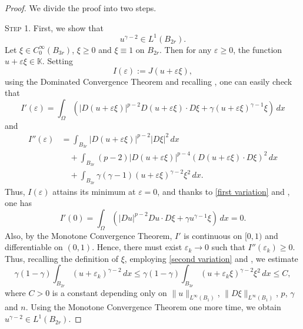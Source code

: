 \documentclass[11pt, reqno]{amsart}
\numberwithin{equation}{section}
\numberwithin{theorem}{section}
\numberwithin{lemma}{section}
\numberwithin{corollary}{section}
\numberwithin{remark}{section}
\numberwithin{proposition}{section}
\numberwithin{definition}{section}
\begin{document}
\begin{proof} We divide the proof into two steps.

    \textsc{Step 1.} First, we show that
    \begin{equation}\label{new integrability}
        u^{\gamma-2}\in L^1(B_{2r}).
    \end{equation}
    Let $\xi\in C_0^\infty(B_{3r})$, $\xi\ge0$ and $\xi\equiv1$ on $B_{2r}$. Then for any $\varepsilon\ge0$, the function $u+\varepsilon\xi\in\mathbb{K}$. Setting 
    $$
    I(\varepsilon):=J(u+\varepsilon\xi),
    $$
    using the Dominated Convergence Theorem and recalling , one can easily check that 
    \begin{equation}\label{first variation}
        I'(\varepsilon)=\int_\Omega(|D(u+\varepsilon\xi)|^{p-2}D(u+\varepsilon\xi)\cdot D\xi+\gamma(u+\varepsilon\xi)^{\gamma-1}\xi)\,dx
    \end{equation}
    and
    \begin{align}\label{second variation}
        I''(\varepsilon)&=\int_{B_{3r}}|D(u+\varepsilon\xi)|^{p-2}|D\xi|^2\,dx\nonumber\\
        &\quad+\int_{B_{3r}}(p-2)|D(u+\varepsilon\xi)|^{p-4}(D(u+\varepsilon\xi)\cdot D\xi)^2\,dx\nonumber\\
        &\quad+\int_{B_{3r}}\gamma(\gamma-1)(u+\varepsilon\xi)^{\gamma-2}\xi^2\,dx.
    \end{align}
    Thus, $I(\varepsilon)$ attains its minimum at $\varepsilon=0$, and thanks to \eqref{first variation} and , one has
    $$
    I'(0)=\int_\Omega(|Du|^{p-2}Du\cdot D\xi+\gamma u^{\gamma-1}\xi)\,dx=0.
    $$
    Also, by the Monotone Convergence Theorem, $I'$ is continuous on $[0,1)$ and differentiable on $(0,1)$. Hence, there must exist $\varepsilon_k\to0$ such that $I''(\varepsilon_k)\ge0$. Thus, recalling the definition of $\xi$, employing \eqref{second variation} and , we estimate
    \begin{equation*}
        \gamma(1-\gamma)\int_{B_{2r}}(u+\varepsilon_k)^{\gamma-2}\,dx\le\gamma(1-\gamma)\int_{B_{3r}}(u+\varepsilon_k\xi)^{\gamma-2}\xi^2\,dx\le C,
    \end{equation*}
    where $C>0$ is a constant depending only on $\|u\|_{L^\infty(B_1)}$, $\|D\xi\|_{L^\infty(B_1)}$, $p$, $\gamma$ and $n$. Using the Monotone Convergence Theorem one more time, we obtain $u^{\gamma-2}\in L^1(B_{2r})$.
    \vspace{0.2cm}


\end{proof}
\end{document}
